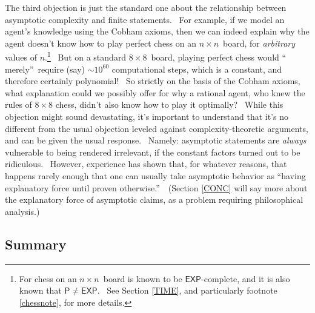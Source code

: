 \documentclass[11pt,onecolumn]{article}%
\begin{document}
The third objection is just the standard one about the relationship between
asymptotic complexity and finite statements. \ For example, if we model an
agent's knowledge using the Cobham axioms, then we can indeed explain why the
agent doesn't know how to play perfect chess on an $n\times n$\ board, for
\textit{arbitrary} values of $n$.\footnote{For chess on an $n\times n$\ board
is known to be $\mathsf{EXP}$-complete, and it is also known that
$\mathsf{P}\neq\mathsf{EXP}$. \ See Section \ref{TIME}, and particularly
footnote \ref{chessnote}, for more details.} \ But on a standard $8\times
8$\ board, playing perfect chess would \textquotedblleft
merely\textquotedblright\ require (say) $\sim10^{60}$ computational steps,
which is a constant, and therefore certainly polynomial! \ So strictly on the
basis of the Cobham axioms, what explanation could we possibly offer for why a
rational agent, who knew the rules of $8\times8$ chess, didn't also know how
to play it optimally? \ While this objection might sound devastating, it's
important to understand that it's no different from the usual objection
leveled against complexity-theoretic arguments, and can be given the usual
response. \ Namely: asymptotic statements are \textit{always} vulnerable to
being rendered irrelevant, if the constant factors turned out to be
ridiculous. \ However, experience has shown that, for whatever reasons, that
happens rarely enough that one can usually take asymptotic behavior as
\textquotedblleft having explanatory force until proven
otherwise.\textquotedblright\ \ (Section \ref{CONC} will say more about the
explanatory force of asymptotic claims, as a problem requiring philosophical analysis.)

\subsection{Summary}
\end{document}
